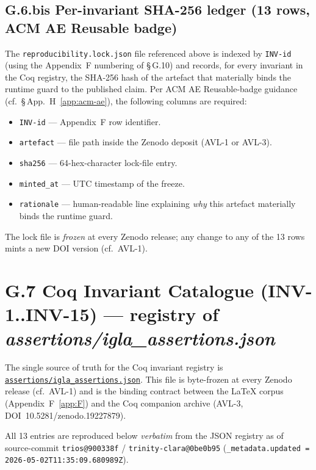 \subsection*{G.6.bis Per-invariant SHA-256 ledger (13 rows, ACM AE Reusable badge)}

\noindent The \texttt{reproducibility.lock.json} file referenced above is
indexed by \texttt{INV-id} (using the Appendix~F numbering of \S\,G.10) and
records, for every invariant in the Coq registry, the SHA-256 hash of the
artefact that materially binds the runtime guard to the published claim.
Per ACM AE Reusable-badge guidance (cf.\ \S\,App.~H~\ref{app:acm-ae}), the
following columns are required:

\begin{itemize}\setlength\itemsep{0.1em}
  \item \texttt{INV-id} — Appendix~F row identifier.
  \item \texttt{artefact} — file path inside the Zenodo deposit (AVL-1 or AVL-3).
  \item \texttt{sha256} — 64-hex-character lock-file entry.
  \item \texttt{minted\_at} — UTC timestamp of the freeze.
  \item \texttt{rationale} — human-readable line explaining \emph{why} this
    artefact materially binds the runtime guard.
\end{itemize}

\noindent The lock file is \emph{frozen} at every Zenodo release; any change to
any of the 13 rows mints a new DOI version (cf.\ AVL-1).


\section*{G.7 Coq Invariant Catalogue (INV-1..INV-15) — registry of \emph{assertions/igla\_assertions.json}}

\noindent The single source of truth for the Coq invariant registry is
\href{https://github.com/gHashTag/trios/blob/main/assertions/igla\_assertions.json}
  {\texttt{assertions/igla\_assertions.json}}.
This file is byte-frozen at every Zenodo release (cf.\ AVL-1) and is the
binding contract between the LaTeX corpus (Appendix~F~\ref{app:F})
and the Coq companion archive (AVL-3, DOI~10.5281/zenodo.19227879).

All 13 entries are reproduced below \emph{verbatim} from the JSON registry as
of source-commit \texttt{trios@900338f} / \texttt{trinity-clara@0be0b95}
(\texttt{\_metadata.updated = 2026-05-02T11:35:09.680989Z}).

